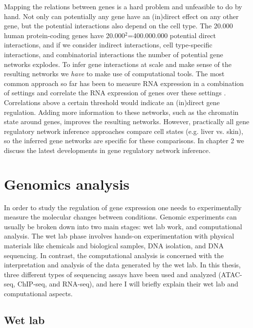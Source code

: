 Mapping the relations between genes is a hard problem and unfeasible to do by hand. Not only can potentially any gene have an (in)direct effect on any other gene, but the potential interactions also depend on the cell type. The 20.000 human protein-coding genes have 20.000$^2$=400.000.000 potential direct interactions, and if we consider indirect interactions, cell type-specific interactions, and combinatorial interactions the number of potential gene networks explodes. To infer gene interactions at scale and make sense of the resulting networks we \textit{have} to make use of computational tools. The most common approach so far has been to measure RNA expression in a combination of settings and correlate the RNA expression of genes over these settings \cite{Zhang_2005,Margolin_2006}. Correlations above a certain threshold would indicate an (in)direct gene regulation. Adding more information to these networks, such as the chromatin state around genes\cite{Xu_2020,Kamal_2021}, improves the resulting networks. However, practically all gene regulatory network inference approaches compare cell states (e.g. liver vs. skin), so the inferred gene networks are specific for these comparisons. In chapter 2 we discuss the latest developments in gene regulatory network inference.

\section{Genomics analysis}

In order to study the regulation of gene expression one needs to experimentally measure the molecular changes between conditions. Genomic experiments can usually be broken down into two main stages: wet lab work,  and computational analysis. The wet lab phase involves hands-on experimentation with physical materials like chemicals and biological samples, DNA isolation, and DNA sequencing. In contrast, the computational analysis is concerned with the interpretation and analysis of the data generated by the wet lab.  In this thesis, three different types of sequencing assays have been used and analyzed (ATAC-seq, ChIP-seq, and RNA-seq), and here I will briefly explain their wet lab and computational aspects. 

\subsection{Wet lab}

